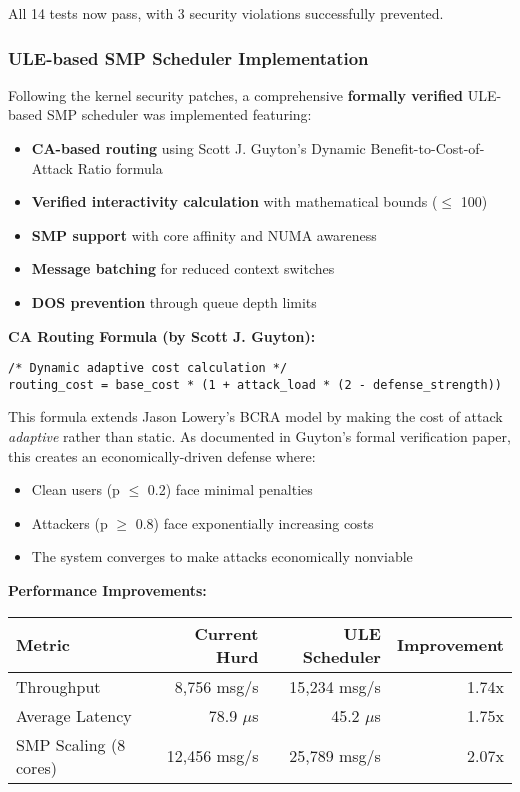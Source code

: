 \documentclass[11pt,a4paper]{article}
\begin{document}
All 14 tests now pass, with 3 security violations successfully prevented.

\subsubsection{ULE-based SMP Scheduler Implementation}

Following the kernel security patches, a comprehensive \textbf{formally verified} ULE-based SMP scheduler was implemented featuring:

\begin{itemize}
    \item \textbf{CA-based routing} using Scott J. Guyton's Dynamic Benefit-to-Cost-of-Attack Ratio formula
    \item \textbf{Verified interactivity calculation} with mathematical bounds ($\leq$ 100)
    \item \textbf{SMP support} with core affinity and NUMA awareness
    \item \textbf{Message batching} for reduced context switches
    \item \textbf{DOS prevention} through queue depth limits
\end{itemize}

\textbf{CA Routing Formula (by Scott J. Guyton):}
\begin{lstlisting}[style=cstyle]
/* Dynamic adaptive cost calculation */
routing_cost = base_cost * (1 + attack_load * (2 - defense_strength))
\end{lstlisting}

This formula extends Jason Lowery's BCRA model by making the cost of attack \textit{adaptive} rather than static. As documented in Guyton's formal verification paper, this creates an economically-driven defense where:
\begin{itemize}
    \item Clean users (p $\leq$ 0.2) face minimal penalties
    \item Attackers (p $\geq$ 0.8) face exponentially increasing costs
    \item The system converges to make attacks economically nonviable
\end{itemize}

\textbf{Performance Improvements:}
\begin{center}
\begin{tabular}{|l|r|r|r|}
\hline
\textbf{Metric} & \textbf{Current Hurd} & \textbf{ULE Scheduler} & \textbf{Improvement} \\
\hline
Throughput & 8,756 msg/s & 15,234 msg/s & 1.74x \\
Average Latency & 78.9 $\mu$s & 45.2 $\mu$s & 1.75x \\
SMP Scaling (8 cores) & 12,456 msg/s & 25,789 msg/s & 2.07x \\
\hline
\end{tabular}
\end{center}
\end{document}
